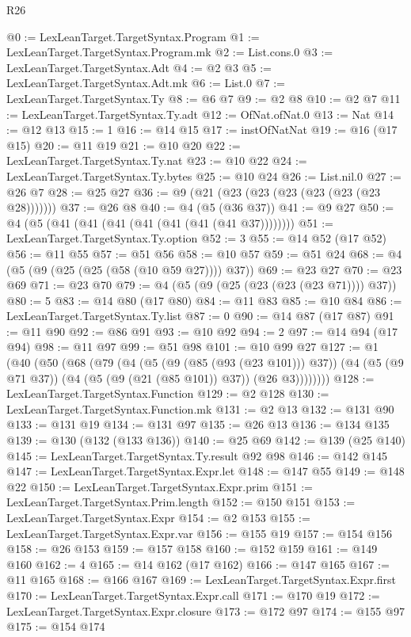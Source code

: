 \begin{lexlean}{R26}
\begin{coremodule}
@0 := LexLeanTarget.TargetSyntax.Program
@1 := LexLeanTarget.TargetSyntax.Program.mk
@2 := List.cons.{0}
@3 := LexLeanTarget.TargetSyntax.Adt
@4 := @2 @3
@5 := LexLeanTarget.TargetSyntax.Adt.mk
@6 := List.{0}
@7 := LexLeanTarget.TargetSyntax.Ty
@8 := @6 @7
@9 := @2 @8
@10 := @2 @7
@11 := LexLeanTarget.TargetSyntax.Ty.adt
@12 := OfNat.ofNat.{0}
@13 := Nat
@14 := @12 @13
@15 := 1
@16 := @14 @15
@17 := instOfNatNat
@19 := @16 (@17 @15)
@20 := @11 @19
@21 := @10 @20
@22 := LexLeanTarget.TargetSyntax.Ty.nat
@23 := @10 @22
@24 := LexLeanTarget.TargetSyntax.Ty.bytes
@25 := @10 @24
@26 := List.nil.{0}
@27 := @26 @7
@28 := @25 @27
@36 := @9 (@21 (@23 (@23 (@23 (@23 (@23 (@23 @28)))))))
@37 := @26 @8
@40 := @4 (@5 (@36 @37))
@41 := @9 @27
@50 := @4 (@5 (@41 (@41 (@41 (@41 (@41 (@41 (@41 @37))))))))
@51 := LexLeanTarget.TargetSyntax.Ty.option
@52 := 3
@55 := @14 @52 (@17 @52)
@56 := @11 @55
@57 := @51 @56
@58 := @10 @57
@59 := @51 @24
@68 := @4 (@5 (@9 (@25 (@25 (@58 (@10 @59 @27)))) @37))
@69 := @23 @27
@70 := @23 @69
@71 := @23 @70
@79 := @4 (@5 (@9 (@25 (@23 (@23 (@23 @71)))) @37))
@80 := 5
@83 := @14 @80 (@17 @80)
@84 := @11 @83
@85 := @10 @84
@86 := LexLeanTarget.TargetSyntax.Ty.list
@87 := 0
@90 := @14 @87 (@17 @87)
@91 := @11 @90
@92 := @86 @91
@93 := @10 @92
@94 := 2
@97 := @14 @94 (@17 @94)
@98 := @11 @97
@99 := @51 @98
@101 := @10 @99 @27
@127 := @1
    (@40
      (@50
        (@68
          (@79
            (@4
              (@5 (@9 (@85 (@93 (@23 @101))) @37))
              (@4 (@5 (@9 @71 @37)) (@4 (@5 (@9 (@21 (@85 @101)) @37)) (@26 @3))))))))
@128 := LexLeanTarget.TargetSyntax.Function
@129 := @2 @128
@130 := LexLeanTarget.TargetSyntax.Function.mk
@131 := @2 @13
@132 := @131 @90
@133 := @131 @19
@134 := @131 @97
@135 := @26 @13
@136 := @134 @135
@139 := @130 (@132 (@133 @136))
@140 := @25 @69
@142 := @139 (@25 @140)
@145 := LexLeanTarget.TargetSyntax.Ty.result @92 @98
@146 := @142 @145
@147 := LexLeanTarget.TargetSyntax.Expr.let
@148 := @147 @55
@149 := @148 @22
@150 := LexLeanTarget.TargetSyntax.Expr.prim
@151 := LexLeanTarget.TargetSyntax.Prim.length
@152 := @150 @151
@153 := LexLeanTarget.TargetSyntax.Expr
@154 := @2 @153
@155 := LexLeanTarget.TargetSyntax.Expr.var
@156 := @155 @19
@157 := @154 @156
@158 := @26 @153
@159 := @157 @158
@160 := @152 @159
@161 := @149 @160
@162 := 4
@165 := @14 @162 (@17 @162)
@166 := @147 @165
@167 := @11 @165
@168 := @166 @167
@169 := LexLeanTarget.TargetSyntax.Expr.first
@170 := LexLeanTarget.TargetSyntax.Expr.call
@171 := @170 @19
@172 := LexLeanTarget.TargetSyntax.Expr.closure
@173 := @172 @97
@174 := @155 @97
@175 := @154 @174

\end{coremodule}
\end{lexlean}

